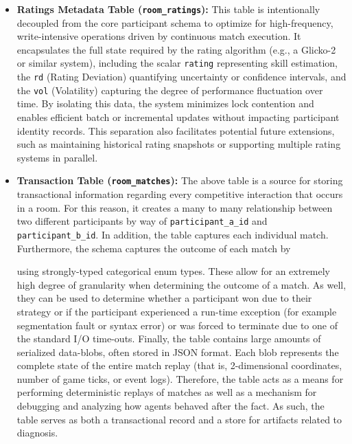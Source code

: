 \documentclass[12pt,a4paper]{report}
\begin{document}
\begin{itemize}
    with no shared relational linkage. Beyond identity, this table stores references to the participant's submitted bot logic, typically as filesystem paths or object storage URIs pointing to serialized binaries or compiled artifacts. Additional metadata such as submission timestamps, version hashes, or execution language identifiers may also be included to support reproducibility, auditing, and sandboxed execution workflows.

    \item \textbf{Ratings Metadata Table (\texttt{room\_ratings}):} This table is intentionally decoupled from the core participant schema to optimize for high-frequency, write-intensive operations driven by continuous match execution. It encapsulates the full state required by the rating algorithm (e.g., a Glicko-2 or similar system), including the scalar \texttt{rating} representing skill estimation, the \texttt{rd} (Rating Deviation) quantifying uncertainty or confidence intervals, and the \texttt{vol} (Volatility) capturing the degree of performance fluctuation over time. By isolating this data, the system minimizes lock contention and enables efficient batch or incremental updates without impacting participant identity records. This separation also facilitates potential future extensions, such as maintaining historical rating snapshots or supporting multiple rating systems in parallel.

    \item \textbf{Transaction Table (\texttt{room\_matches}):} The above table is a source for storing transactional information regarding every competitive interaction that occurs in a room. For this reason, it creates a many to many relationship between two different participants by way of \texttt{participant\_a\_id} and \texttt{participant\_b\_id}. In addition, the table captures each individual match. Furthermore, the schema captures the outcome of each match by 
    
    using strongly-typed categorical enum types. These allow for an extremely high degree of granularity when determining the outcome of a match. As well, they can be used to determine whether a participant won due to their strategy or if the participant experienced a run-time exception (for example segmentation fault or syntax error) or was forced to terminate due to one of the standard I/O time-outs. Finally, the table contains large amounts of serialized data-blobs, often stored in JSON format. Each blob represents the complete state of the entire match replay (that is, 2-dimensional coordinates, number of game ticks, or event logs). Therefore, the table acts as a means for performing deterministic replays of matches as well as a mechanism for debugging and analyzing how agents behaved after the fact. As such, the table serves as both a transactional record and a store for artifacts related to diagnosis.
\end{itemize}
\end{document}
